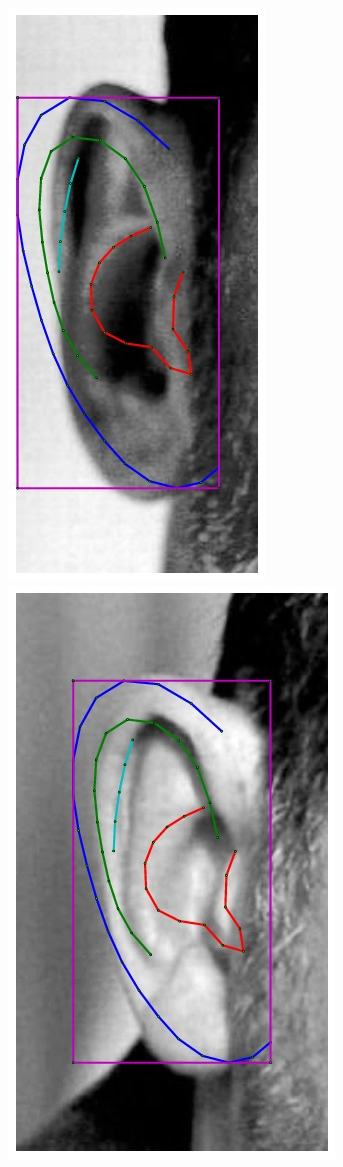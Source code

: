 \begin{figure}[!t]
    \includegraphics[height=\flowh]{resources/Ear_Deformable_Model/fittings/initial_0004}
    \includegraphics[height=\flowh]{resources/Ear_Deformable_Model/fittings/initial_0005}

\end{figure}

